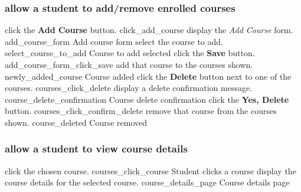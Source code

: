 \documentclass[12pt]{article}
\newenvironment{requirement}[1]
{
    \renewcommand{\thesubsubsection}{R\arabic{subsubsection}.}
    \renewcommand{\labelenumi}{
        \arabic{subsubsection}.\arabic{enumi}
    }
    \renewcommand{\labelenumii}{
        \arabic{subsubsection}.\arabic{enumi}.\arabic{enumii}
    }
    \renewcommand{\labelenumiii}{
        \arabic{subsubsection}.\arabic{enumi}.\arabic{enumii}.\arabic{enumiii}
    }
    \renewcommand{\labelenumiv}{
        \arabic{subsubsection}.\arabic{enumi}.\arabic{enumii}.\arabic{enumiii}.\arabic{enumiv}
    }
    \subsubsection{#1}
    \begin{enumerate}
}
{
    \end{enumerate}
}
\begin{document}
\begin{requirement}{\sysshall allow a student to add/remove enrolled courses}
    \navcourses
    \screenshotstep
      {\stushall click the \textbf{Add Course} button.}
      {click_add_course}
      {}
    \screenshotstep
      {\sysshall display the \emph{Add Course} form.}
      {add_course_form}
      {Add course form}
    \screenshotstep
      {\stushall select the course to add.}
      {select_course_to_add}
      {Course to add selected}
    \screenshotstep
      {\stushall click the \textbf{Save} button.}
      {add_course_form_click_save}
      {}
    \screenshotstep
      {\sysshall add that course to the courses shown.}
      {newly_added_course}
      {Course added}
    \screenshotstep
      {\stushall click the \textbf{Delete} button next to one of the courses.}
      {courses_click_delete}
      {}
    \screenshotstep
      {\sysshall display a delete confirmation message.}
      {course_delete_confirmation}
      {Course delete confirmation}
    \screenshotstep
      {\stushall click the \textbf{Yes, Delete} button.}
      {courses_click_confirm_delete}
      {}
    \screenshotstep
      {\sysshall remove that course from the courses shown.}
      {course_deleted}
      {Course removed}
\end{requirement}

\newcommand{\navcoursedetails}{
    \navcourses
    \screenshotstep
      {\stushall click the chosen course.}
      {courses_click_course}
      {Student clicks a course}
    \screenshotstep
      {\sysshall display the course details for the selected course.}
      {course_details_page}
      {Course details page}
}

\begin{requirement}{\sysshall allow a student to view course details}
    \navcoursedetails
\end{requirement}
\end{document}
